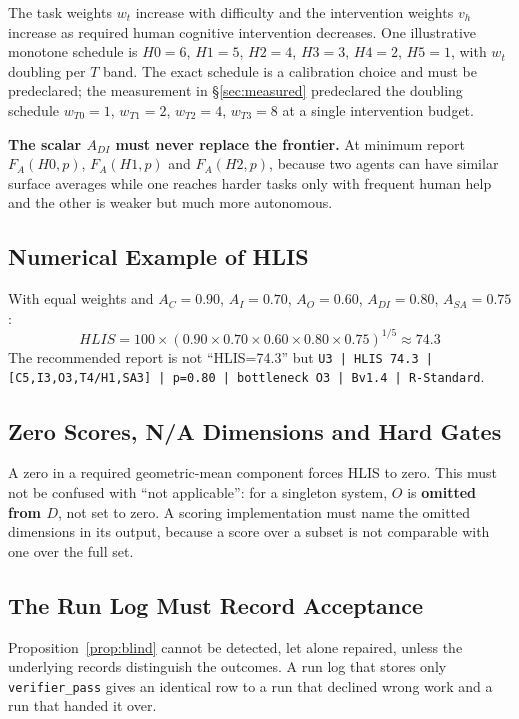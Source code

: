 \documentclass[11pt]{article}
\theoremstyle{definition}
\begin{document}
\sloppy The task weights $w_t$ increase with difficulty and the intervention weights $v_h$ increase as required human cognitive intervention decreases. One illustrative monotone schedule is $H0{=}6$, $H1{=}5$, $H2{=}4$, $H3{=}3$, $H4{=}2$, $H5{=}1$, with $w_t$ doubling per $T$ band. The exact schedule is a calibration choice and must be predeclared; the measurement in \S\ref{sec:measured} predeclared the doubling schedule $w_{T0}{=}1$, $w_{T1}{=}2$, $w_{T2}{=}4$, $w_{T3}{=}8$ at a single intervention budget.

\textbf{The scalar $A_{DI}$ must never replace the frontier.} At minimum report $F_A(H0,p)$, $F_A(H1,p)$ and $F_A(H2,p)$, because two agents can have similar surface averages while one reaches harder tasks only with frequent human help and the other is weaker but much more autonomous.

\subsection{Numerical Example of HLIS}

With equal weights and $A_C=0.90$, $A_I=0.70$, $A_O=0.60$, $A_{DI}=0.80$, $A_{SA}=0.75$:
\begin{equation*}
HLIS = 100 \times (0.90 \times 0.70 \times 0.60 \times 0.80 \times 0.75)^{1/5} \approx 74.3
\end{equation*}
The recommended report is not ``HLIS=74.3'' but
\texttt{U3 | HLIS 74.3 | [C5,I3,O3,T4/H1,SA3] | p=0.80 | bottleneck O3 | Bv1.4 | R-Standard}.

\subsection{Zero Scores, N/A Dimensions and Hard Gates}

A zero in a required geometric-mean component forces HLIS to zero. This must not be confused with ``not applicable'': for a singleton system, $O$ is \textbf{omitted from $D$}, not set to zero. A scoring implementation must name the omitted dimensions in its output, because a score over a subset is not comparable with one over the full set.

\subsection{The Run Log Must Record Acceptance}\label{sec:runlog}

Proposition~\ref{prop:blind} cannot be detected, let alone repaired, unless the underlying records distinguish the outcomes. A run log that stores only \texttt{verifier\_pass} gives an identical row to a run that declined wrong work and a run that handed it over.
\end{document}
